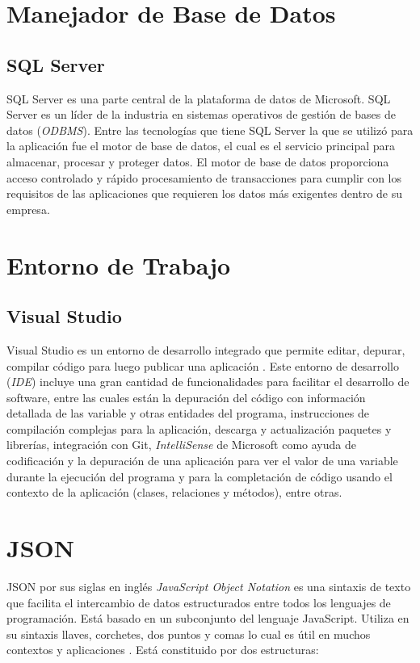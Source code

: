 \section{Manejador de Base de Datos}
\subsection{SQL Server}
SQL Server es una parte central de la plataforma de datos de Microsoft. SQL Server es un líder de la industria en sistemas operativos de gestión de bases de datos (\textit{ODBMS})\cite{sqlServerMicrosoft}. Entre las tecnologías que tiene SQL Server la que se utilizó para la aplicación fue el motor de base de datos, el cual es el servicio principal para almacenar, procesar y proteger datos. El motor de base de datos proporciona acceso controlado y rápido procesamiento de transacciones para cumplir con los requisitos de las aplicaciones que requieren los datos más exigentes dentro de su empresa. 

\section{Entorno de Trabajo}
\subsection{Visual Studio}
Visual Studio es un entorno de desarrollo integrado que permite editar, depurar, compilar código para luego publicar una aplicación \cite{visualStudioMicrosoft}. Este entorno de desarrollo (\textit{IDE}) incluye una gran cantidad de funcionalidades para facilitar el desarrollo de software, entre las cuales están la depuración del código con información detallada de las variable y otras entidades del programa, instrucciones de compilación complejas para la aplicación, descarga y actualización paquetes y librerías, integración con Git, \textit{IntelliSense} de Microsoft como ayuda de codificación y la depuración de una aplicación para ver el valor de una variable durante la ejecución del programa y para la completación de código usando el contexto de la aplicación (clases, relaciones y métodos), entre otras.


\section{JSON}
JSON por sus siglas en inglés \textit{JavaScript Object Notation} es una sintaxis de texto que facilita el intercambio de datos estructurados entre todos los lenguajes de programación. Está basado en un subconjunto del lenguaje JavaScript. Utiliza en su sintaxis llaves, corchetes, dos puntos y comas lo cual es útil en muchos contextos y aplicaciones \cite{json}. Está constituido por dos estructuras:

